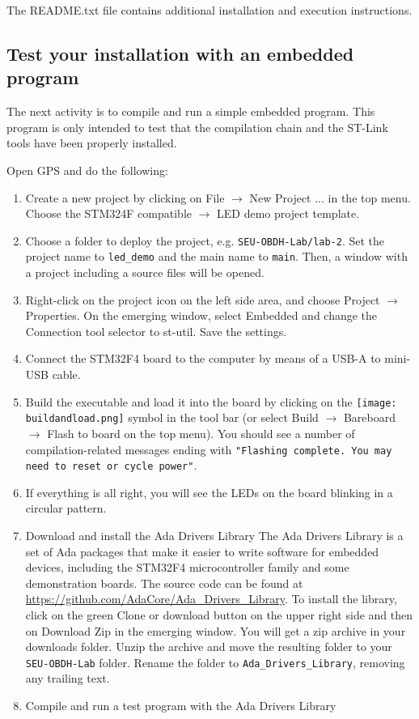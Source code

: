 The README.txt file contains additional installation and execution instructions.

\subsection{Test your installation with an embedded program}

The next activity is to compile and run a simple embedded program.
This program is only intended to test that the compilation chain
and the ST-Link tools have been properly installed.

Open GPS and do the following:
\begin{enumerate}
\item Create a new project by clicking on File $\rightarrow$ New Project ... in the top menu. Choose the STM324F compatible $\rightarrow$ LED demo project template.

\item	Choose a folder to deploy the project, e.g. \textcolor{mPurple}{\texttt{SEU-OBDH-Lab/lab-2}}.
Set the project name to \texttt{led\_demo} and the main name to \texttt{main}.
Then, a window with a project including a source files will be opened.

\item	Right-click on the project icon on the left side area,
and choose Project $\rightarrow$ Properties.
On the emerging window,
select Embedded and change the Connection tool selector to st-util.
Save the settings.

\item	Connect the STM32F4 board to the computer by means of a USB-A to mini-USB cable.

\item	Build the executable and load it into the board by clicking on the
\hbox{\texttt{[image: buildandload.png]}} symbol in the tool bar (or select Build $\rightarrow$ Bareboard $\rightarrow$ Flash to board on the top menu). You should see a number of compilation-related messages ending with \texttt{"Flashing complete. You may need to reset or cycle power"}.

\item	If everything is all right, you will see the LEDs on the board blinking in a circular pattern.

\item Download and install the Ada Drivers Library
The Ada Drivers Library is a set of Ada packages that make it easier to write software for embedded devices, including the STM32F4 microcontroller family and some demonstration boards. The source code can be found at \url{https://github.com/AdaCore/Ada\_Drivers\_Library}. To install the library, click on the green Clone or download button on the upper right side and then on Download Zip in the emerging window. You will get a zip archive in your downloads folder. Unzip the archive and move the resulting folder to your \texttt{SEU-OBDH-Lab} folder. Rename the folder to \textcolor{mPurple}{\texttt{Ada\_Drivers\_Library}}, removing any trailing text.

\item Compile and run a test program with the Ada Drivers Library
\end{enumerate}
